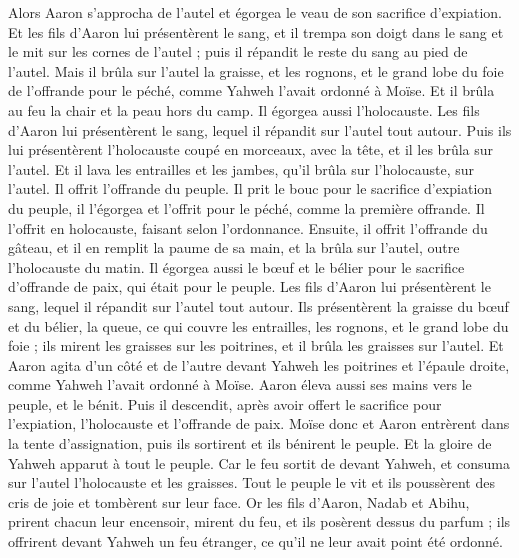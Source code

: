 \begin{multicols}{2}
Alors Aaron s'approcha de l'autel et égorgea le veau de son sacrifice d'expiation.
Et les fils d'Aaron lui présentèrent le sang, et il trempa son doigt dans le sang et le mit sur les cornes de l'autel ; puis il répandit le reste du sang au pied de l'autel.
Mais il brûla sur l'autel la graisse, et les rognons, et le grand lobe du foie de l'offrande pour le péché, comme Yahweh l'avait ordonné à Moïse.
Et il brûla au feu la chair et la peau hors du camp.
Il égorgea aussi l'holocauste. Les fils d'Aaron lui présentèrent le sang, lequel il répandit sur l'autel tout autour.
Puis ils lui présentèrent l'holocauste coupé en morceaux, avec la tête, et il les brûla sur l'autel.
Et il lava les entrailles et les jambes, qu'il brûla sur l'holocauste, sur l'autel.
Il offrit l'offrande du peuple. Il prit le bouc pour le sacrifice d'expiation du peuple, il l'égorgea et l'offrit pour le péché, comme la première offrande.
Il l'offrit en holocauste, faisant selon l'ordonnance.
Ensuite, il offrit l'offrande du gâteau, et il en remplit la paume de sa main, et la brûla sur l'autel, outre l'holocauste du matin.
Il égorgea aussi le bœuf et le bélier pour le sacrifice d'offrande de paix, qui était pour le peuple. Les fils d'Aaron lui présentèrent le sang, lequel il répandit sur l'autel tout autour.
Ils présentèrent la graisse du bœuf et du bélier, la queue, ce qui couvre les entrailles, les rognons, et le grand lobe du foie ;
ils mirent les graisses sur les poitrines, et il brûla les graisses sur l'autel.
Et Aaron agita d'un côté et de l'autre devant Yahweh les poitrines et l'épaule droite, comme Yahweh l'avait ordonné à Moïse.
Aaron éleva aussi ses mains vers le peuple, et le bénit. Puis il descendit, après avoir offert le sacrifice pour l'expiation, l'holocauste et l'offrande de paix.
Moïse donc et Aaron entrèrent dans la tente d'assignation, puis ils sortirent et ils bénirent le peuple. Et la gloire de Yahweh apparut à tout le peuple.
Car le feu sortit de devant Yahweh, et consuma sur l'autel l'holocauste et les graisses. Tout le peuple le vit et ils poussèrent des cris de joie et tombèrent sur leur face.
\VerseOne{}Or les fils d'Aaron, Nadab et Abihu, prirent chacun leur encensoir, mirent du feu, et ils posèrent dessus du parfum ; ils offrirent devant Yahweh un feu étranger, ce qu'il ne leur avait point été ordonné.

\end{multicols}
